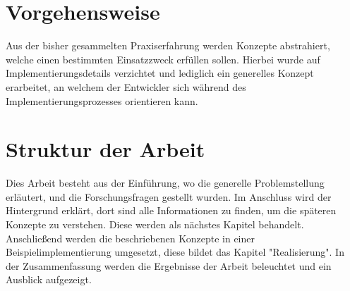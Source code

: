 \section{Vorgehensweise}

Aus der bisher gesammelten Praxiserfahrung werden Konzepte abstrahiert, welche einen bestimmten Einsatzzweck erfüllen sollen. Hierbei wurde auf Implementierungsdetails verzichtet und lediglich ein generelles Konzept erarbeitet, an welchem der Entwickler sich während des Implementierungsprozesses orientieren kann.

\section{Struktur der Arbeit}

Dies Arbeit besteht aus der Einführung, wo die generelle Problemstellung erläutert, und die Forschungsfragen gestellt wurden. Im Anschluss wird der Hintergrund erklärt, dort sind alle Informationen zu finden, um die späteren Konzepte zu verstehen. Diese werden als nächstes Kapitel behandelt. Anschließend werden die beschriebenen Konzepte in einer Beispielimplementierung umgesetzt, diese bildet das Kapitel "Realisierung". In der Zusammenfassung werden die Ergebnisse der Arbeit beleuchtet und ein Ausblick aufgezeigt.
